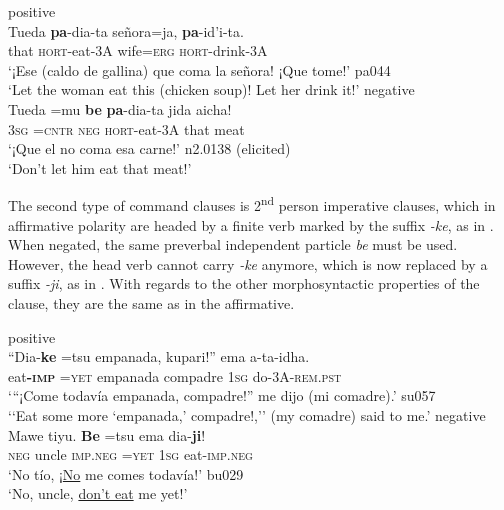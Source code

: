 \documentclass[output=paper]{langsci/langscibook}
\begin{document}
\begin{exe}\ex\label{ex:tacana-hortative}
\begin{xlist}
\ex\label{ex:tacana-hortative-positive} positive\\
\gll {}Tueda \textbf{pa}-dia-ta señora=ja,
\textbf{pa}-id'i-ta.\\
that \textsc{hort}-eat-3A wife\textsc{=erg} \textsc{hort-}drink-3A\\
\glt `¡Ese (caldo de gallina) que coma la señora! ¡Que tome!' pa044\\
‘Let the woman eat this (chicken soup)! Let her drink it!'
\ex\label{ex:tacana-hortative-negative} negative\\
\gll {}Tueda =mu \textbf{be} \textbf{pa}-dia-ta jida aicha{\cb}!\\
3\textsc{sg} =\textsc{cntr} \textsc{neg} \textsc{hort-}eat-3A that meat\\
\glt `¡Que el no coma esa carne!' n2.0138 (elicited)\\
`Don't let him eat that meat!'
\end{xlist}\end{exe}

The second type of command clauses is 2\textsuperscript{nd} person
imperative clauses, which in affirmative polarity are headed by a finite
verb marked by the suffix \textit{-ke}, as in
. When negated, the
same preverbal independent particle \textit{be} must be used.
However, the head verb cannot carry \textit{-ke} anymore, which is now
replaced by a suffix \textit{-ji}, as in
. With regards to the other morphosyntactic properties of the clause, they are the same as in the affirmative.

\begin{exe}\ex\label{ex:tacana-imperative} 
\begin{xlist}
\ex\label{ex:tacana-imperative-positive} positive\\
\gll ``Dia-\textbf{ke}  =tsu  empanada,  kupari!''  ema  a-ta-idha.\\
    eat\textbf{-\textsc{imp}}  =\textsc{yet}  empanada  compadre
    1\textsc{sg}  do-3A\textsc{-rem.pst}\\
\glt `{}``¡Come todavía empanada, compadre!'' me dijo (mi comadre).' su057\\
`{}`Eat some more `empanada,' compadre!,'' (my comadre) said to me.'
\ex\label{ex:tacana-imperative-negative} negative\\
\gll
Mawe  tiyu.  \textbf{Be}  =tsu  ema  dia-\textbf{ji}!\\
\textsc{neg}  uncle  \textsc{imp.neg}  =\textsc{yet}  1\textsc{sg}
eat-\textsc{imp.neg}\\
\glt `No tío, ¡\underline{No} me comes todavía!' bu029\\
`No, uncle, \underline{don't eat} me yet!'
\end{xlist}\end{exe}
\end{document}
